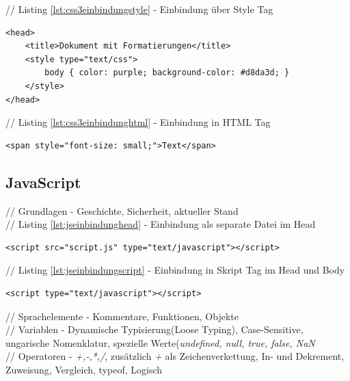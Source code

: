 \documentclass[12pt,a4paper,bibliography=totocnumbered,listof=totocnumbered]{scrartcl}
\begin{document}
// Listing \ref{lst:css3einbindungstyle} - Einbindung über Style Tag
	\vspace{1em}
	\begin{lstlisting}[caption=Stylesheet Einbindung über Style Tag, label=lst:css3einbindungstyle]
<head>
	<title>Dokument mit Formatierungen</title>
	<style type="text/css">
		body { color: purple; background-color: #d8da3d; }
	</style>
</head>
	\end{lstlisting}
	
// Listing \ref{lst:css3einbindunghtml} - Einbindung in HTML Tag
	\vspace{1em}
	\begin{lstlisting}[caption=Stylesheet Einbindung in HTML Tag, label=lst:css3einbindunghtml]
<span style="font-size: small;">Text</span>
	\end{lstlisting}

\subsection{JavaScript}
// Grundlagen - Geschichte, Sicherheit, aktueller Stand\\
// Listing \ref{lst:jseinbindunghead} - Einbindung als separate Datei im Head
	\vspace{1em}
	\begin{lstlisting}[caption=JavaScript Einbindung als separate Datei im Head, label=lst:jseinbindunghead]
<script src="script.js" type="text/javascript"></script>
	\end{lstlisting}

// Listing \ref{lst:jseinbindungscript} - Einbindung in Skript Tag im Head und Body
	\vspace{1em}
	\begin{lstlisting}[caption=JavaScript Einbindung in Skript Tag im Head und Body, label=lst:jseinbindungscript]
<script type="text/javascript"></script>
	\end{lstlisting}

// Sprachelemente - Kommentare, Funktionen, Objekte\\

// Variablen - Dynamische Typisierung(Loose Typing), Case-Sensitive, ungarische Nomenklatur, spezielle Werte(\textit{undefined, null, true, false, NaN}\\

// Operatoren - \textit{+,-,*,/}, zusätzlich \textit{+} als Zeichenverkettung, In- und Dekrement, Zuweisung, Vergleich, typeof, Logisch\\
\end{document}
